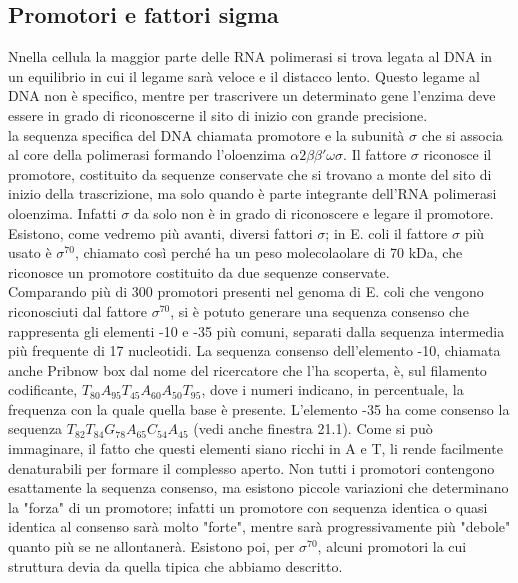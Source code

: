 \documentclass{article}
\begin{document}
\subsection{Promotori e fattori sigma}
Nnella cellula la maggior parte
delle RNA polimerasi si trova legata al DNA in un equilibrio in cui il legame
sarà veloce e il distacco lento. Questo legame al DNA non è specifico, mentre
per trascrivere un determinato gene l'enzima deve essere in grado di riconoscerne
il sito di inizio con grande precisione.\\

la sequenza specifica del DNA chiamata promotore e la subunità $\sigma$
che si associa al core della polimerasi formando l'oloenzima $\alpha 2 \beta\beta'\omega \sigma$. Il fattore
$\sigma$ riconosce il promotore, costituito da sequenze conservate che si trovano a
monte del sito di inizio della trascrizione, ma solo quando è parte integrante
dell'RNA polimerasi oloenzima. Infatti $\sigma$ da solo non è in grado di riconoscere
e legare il promotore. Esistono, come vedremo più avanti, diversi fattori $\sigma$; in E.
coli il fattore $\sigma$ più usato è $\sigma^{70}$, chiamato così perché ha un peso molecolaolare di
70 kDa, che riconosce un promotore costituito da due sequenze conservate.\\
Comparando più di 300 promotori presenti nel genoma di E. coli
che vengono riconosciuti dal fattore $\sigma^{70}$, si è potuto generare una sequenza consenso che rappresenta gli elementi -10 e -35 più comuni, separati dalla sequenza
intermedia più frequente di 17 nucleotidi. La sequenza consenso dell'elemento
-10, chiamata anche Pribnow box dal nome del ricercatore che l'ha scoperta,
è, sul filamento codificante, $T_{80}A_{95}T_{45}A_{60}A_{50}T_{95}$, dove i numeri indicano, in
percentuale, la frequenza con la quale quella base è presente. L'elemento -35 ha
come consenso la sequenza $T_{82}T_{84}G_{78}A_{65}C_{54}A_{45}$ (vedi anche finestra 21.1). Come si può immaginare, il fatto che questi elementi siano ricchi in A e T, li rende
facilmente denaturabili per formare il complesso aperto. Non tutti i promotori
contengono esattamente la sequenza consenso, ma esistono piccole variazioni
che determinano la "forza" di un promotore; infatti un promotore con sequenza
identica o quasi identica al consenso sarà molto "forte", mentre sarà progressivamente più "debole" quanto più se ne allontanerà.
Esistono poi, per $\sigma^{70}$, alcuni promotori la cui struttura devia da quella tipica
che abbiamo descritto.
\end{document}
